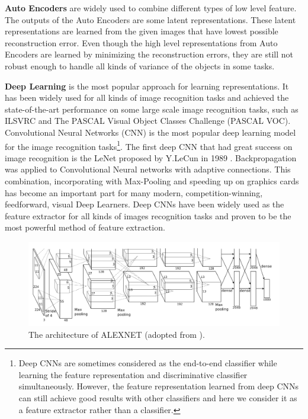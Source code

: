 \textbf{Auto Encoders} are widely used to combine different types of low level feature. The outputs of the Auto Encoders are some latent representations. These latent representations are learned from the given images that have lowest possible reconstruction error. Even though the high level representations from Auto Encoders are learned by minimizing the reconstruction errors, they are still not robust enough to handle all kinds of variance of the objects in some tasks.

\textbf{Deep Learning} is the most popular approach for learning representations. It has been widely used for all kinds of image recognition tasks and achieved the state-of-the-art performance on some large scale image recognition tasks, such as ILSVRC and The PASCAL Visual Object Classes Challenge (PASCAL VOC). 
Convolutional Neural Networks (CNN) is the most popular deep learning model for the image recognition tasks\footnote{Deep CNNs are sometimes considered as the end-to-end classifier while learning the feature representation and discriminative classifier simultaneously. However, the feature representation learned from deep CNNs can still achieve good results with other classifiers and here we consider it as a feature extractor rather than a classifier.}. The first deep CNN that had great success on image recognition is the LeNet proposed by Y.LeCun in 1989 \cite{lecun1989backpropagation}. Backpropagation was applied to Convolutional Neural networks with adaptive connections. This combination, incorporating with Max-Pooling and speeding up on graphics cards has become an important part for  many modern, competition-winning, feedforward, visual Deep Learners. Deep CNNs have been widely used as the feature extractor for all kinds of images recognition tasks and proven to be the most powerful method of feature extraction.
\begin{figure}
	\centering
	\includegraphics[scale=.3]{introduction/fig/alexnet.png}
	\caption{The architecture of ALEXNET (adopted from \cite{krizhevsky2012imagenet}).}\label{fig:intro:alex}
\end{figure}

